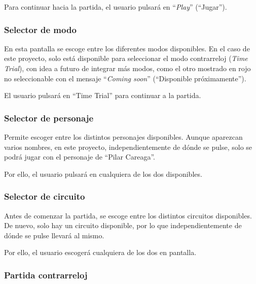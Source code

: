 Para continuar hacia la partida, el usuario pulsará en ``\textit{Play}'' (``Jugar'').

\subsubsection{Selector de modo}

En esta pantalla se escoge entre los diferentes modos disponibles. En el caso de este proyecto, solo está disponible para seleccionar el modo contrarreloj (\textit{Time Trial}), con idea a futuro de integrar más modos, como el otro mostrado en rojo no seleccionable con el mensaje ``\textit{Coming soon}'' (``Disponible próximamente'').


El usuario pulsará en ``Time Trial'' para continuar a la partida.

\subsubsection{Selector de personaje}

Permite escoger entre los distintos personajes disponibles. Aunque aparezcan varios nombres, en este proyecto, independientemente de dónde se pulse, solo se podrá jugar con el personaje de ``Pilar Careaga''.


Por ello, el usuario pulsará en cualquiera de los dos disponibles.

\subsubsection{Selector de circuito}

Antes de comenzar la partida, se escoge entre los distintos circuitos disponibles. De nuevo, solo hay un circuito disponible, por lo que independientemente de dónde se pulse llevará al mismo.


Por ello, el usuario escogerá cualquiera de los dos en pantalla.

\subsubsection{Partida contrarreloj}

